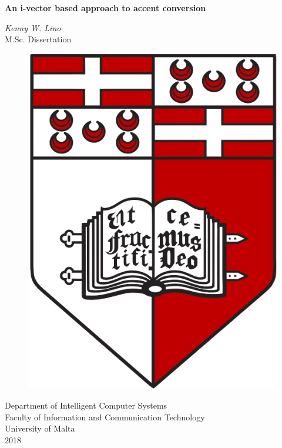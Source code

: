 \documentclass
[
    a4paper,
    twoside,
    12pt,
]
{report}
\begin{document}
\begin{titlepage}
    \vspace*{1.0cm}
    \begin{center}
        \begin{Large}
        \textbf{An i-vector based approach to accent conversion} \\
        \end{Large}
        \vspace*{1.0cm}
        \textit{Kenny W. Lino} \\
        \vspace*{1.5cm}
        M.Sc. Dissertation \\
        \vspace*{0.5cm}
        \begin{figure}[H]
        \centering
        \includegraphics[scale=0.15]{img/UM-coat-of-arms.png}
    	\end{figure}
       \vspace*{1.0cm}
       Department of Intelligent Computer Systems \\
       Faculty of Information and Communication Technology \\
       University of Malta \\
       2018 \\
       

\end{center}
\end{titlepage}
\end{document}
